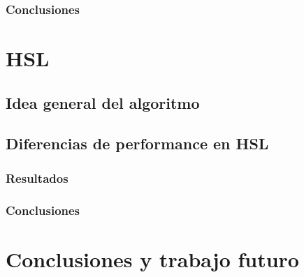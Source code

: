 \documentclass[a4paper]{article}
\begin{document}
\subsubsection{Conclusiones}


\newpage

\section{HSL}

\subsection{Idea general del algoritmo}



\subsection{Diferencias de performance en HSL}



\subsubsection{Resultados}

\subsubsection{Conclusiones}


\newpage
\section{Conclusiones y trabajo futuro}
\end{document}
